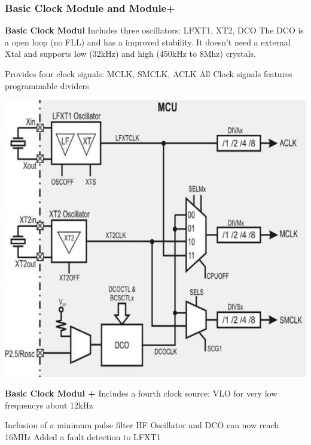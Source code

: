 \subsubsection{Basic Clock Module and Module+ }
\begin{minipage}{0.585\linewidth}
    \textbf{Basic Clock Modul}\newline
    Includes three oscillators:\newline
    LFXT1, XT2, DCO\newline
    The DCO is a open loop (no FLL) and has a improved stability. \newline
    It doesn't need a external Xtal and supports low (32kHz) and high (450kHz to 8Mhz) crystals.\newline\newline
    
    Provides four clock signals:\newline
    MCLK, SMCLK, ACLK \newline
    All Clock signals features programmable dividers
\end{minipage}
\begin{minipage}{0.41\linewidth}
    \includegraphics[width=0.8\linewidth]{images/BasicClock} 
\end{minipage}
\vspace{0.5cm}
\begin{minipage}{0.585\linewidth}
    \textbf{Basic Clock Modul +}\newline\newline
    Includes a fourth clock source:\newline
    VLO for very low frequencys about 12kHz\newline\newline
    
    Inclusion of a minimum pulse filter \newline
    HF Oscillator and DCO can now reach 16MHz\newline
    Added a fault detection to LFXT1
\end{minipage}
